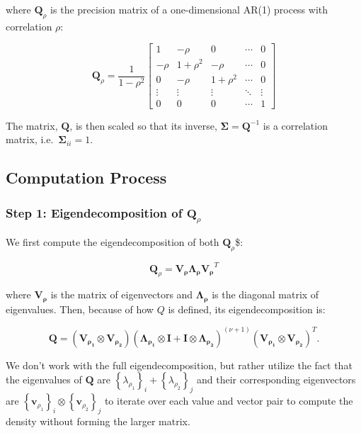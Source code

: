 \documentclass[
  letterpaper,
  DIV=11,
  numbers=noendperiod]{scrartcl}
\begin{document}
where \(\mathbf{Q}_\rho\) is the precision matrix of a one-dimensional
AR(1) process with correlation \(\rho\):

\[
\mathbf{Q}_\rho = \frac{1}{1-\rho^2}
\begin{bmatrix}
1 & -\rho & 0 & \cdots & 0 \\
-\rho & 1+\rho^2 & -\rho & \cdots & 0 \\
0 & -\rho & 1+\rho^2 & \cdots & 0 \\
\vdots & \vdots & \vdots & \ddots & \vdots \\
0 & 0 & 0 & \cdots & 1
\end{bmatrix}
\]

The matrix, \(\mathbf Q\), is then scaled so that its inverse,
\(\mathbf \Sigma = \mathbf Q^{-1}\) is a correlation matrix,
i.e.~\(\mathbf \Sigma_{ii} = 1\).

\subsection{Computation Process}\label{computation-process}

\subsubsection{\texorpdfstring{Step 1: Eigendecomposition of
\(\mathbf{Q}_{\rho}\)}{Step 1: Eigendecomposition of \textbackslash mathbf\{Q\}\_\{\textbackslash rho\}}}\label{step-1-eigendecomposition-of-mathbfq_rho}

We first compute the eigendecomposition of both \(\mathbf{Q}_{\rho}\)\$:

\[
\mathbf{Q}_{\rho} = \mathbf{V_{\rho}}\mathbf{\Lambda_\rho}\mathbf{V_\rho}^T
\]

where \(\mathbf{V_\rho}\) is the matrix of eigenvectors and
\(\mathbf{\Lambda_\rho}\) is the diagonal matrix of eigenvalues. Then,
because of how \(Q\) is defined, its eigendecomposition is:

\[
\mathbf{Q} = (\mathbf{V_{\rho_1}} \otimes \mathbf{V_{\rho_2}})(\mathbf{\Lambda_{\rho_1}} \otimes \mathbf{I} + \mathbf{I} \otimes \mathbf{\Lambda_{\rho_2}})^{(\nu + 1)}(\mathbf{V_{\rho_1}} \otimes \mathbf{V_{\rho_2}})^T.
\]

We don't work with the full eigendecomposition, but rather utilize the
fact that the eigenvalues of \(\mathbf Q\) are
\(\left\{\lambda_{\rho_1}\right\}_i + \left\{\lambda_{\rho_2}\right\}_j\)
and their corresponding eigenvectors are
\(\left\{\mathbf{v}_{\rho_1}\right\}_i \otimes \left\{\mathbf{v}_{\rho_2}\right\}_j\)
to iterate over each value and vector pair to compute the density
without forming the larger matrix.
\end{document}
